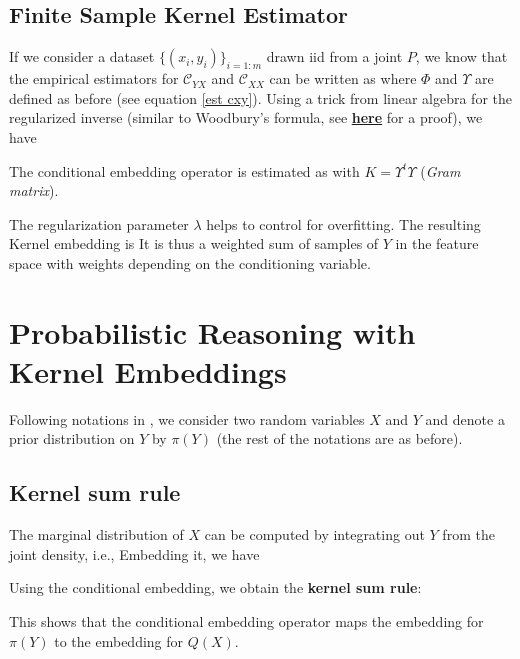 \subsection{Finite Sample Kernel Estimator}

If we consider a dataset $\{(x_{i},y_{i})\}_{i=1:m}$ drawn iid from a joint $P$, we know that the empirical estimators for $\mathcal C_{YX}$ and $\mathcal C_{XX}$ can be written as
where $\Phi$ and $\Upsilon$ are defined as before (see equation \eqref{est cxy}). Using a trick from linear algebra for the regularized inverse (similar to Woodbury's formula, see \href{blog_linalg_invlemmas.html\#lemma2simple}{\textbf{here}} for a proof), we have
\begin{ybox}
The conditional embedding operator is estimated as
with $K=\Upsilon^{t}\Upsilon$ (\emph{Gram matrix}).
\end{ybox}
The regularization parameter $\lambda$ helps to control for overfitting. The resulting Kernel embedding is
It is thus a weighted sum of samples of $Y$ in the feature space with weights depending on the conditioning variable.
\section{Probabilistic Reasoning with Kernel Embeddings}
Following notations in , we consider two random variables $X$ and $Y$ and denote a prior distribution on $Y$ by $\pi(Y)$ (the rest of the notations are as before).
\subsection{Kernel sum rule}
The marginal distribution of $X$ can be computed by integrating out $Y$ from the joint density, i.e.,
Embedding it, we have
\begin{ybox}
Using the conditional embedding, we obtain the \textbf{kernel sum rule}:
\end{ybox}
This shows that the conditional embedding operator maps the embedding for $\pi(Y)$ to the embedding for $Q(X)$.

